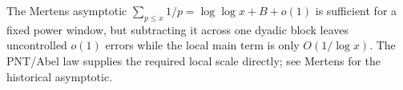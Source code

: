 \begin{remark}
The Mertens asymptotic $\sum_{p\le x}1/p=\log\log x+B+o(1)$ is sufficient for a
fixed power window, but subtracting it across one dyadic block leaves
uncontrolled $o(1)$ errors while the local main term is only $O(1/\log x)$.
The PNT/Abel law supplies the required local scale directly; see Mertens
\cite{Mertens1874} for the historical asymptotic.
\end{remark}
